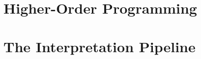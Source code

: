 \documentclass{memoir}
\begin{document}
\chapter{Higher-Order Programming}




\chapter{The Interpretation Pipeline}







\end{document}
